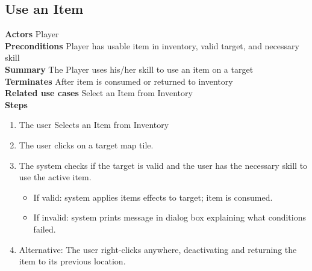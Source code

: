 \documentclass{report}
\begin{document}
\subsection{Use an Item}
\textbf{Actors} Player \\
\textbf{Preconditions} Player has usable item in inventory, valid target, and necessary skill \\
\textbf{Summary} The Player uses his/her skill to use an item on a target \\
\textbf{Terminates} After item is consumed or returned to inventory \\
\textbf{Related use cases} Select an Item from Inventory \\
\textbf{Steps}
\begin{enumerate}
	\item The user Selects an Item from Inventory
	\item The user clicks on a target map tile.
	\item The system checks if the target is valid and the user has the necessary skill to use the active item.
	\begin{itemize}
		\item If valid: system applies items effects to target; item is consumed.
		\item If invalid:  system prints message in dialog box explaining what conditions failed.
	\end{itemize}
	\item Alternative: The user right-clicks anywhere, deactivating and returning the item to its previous location.
\end{enumerate}
\end{document}
